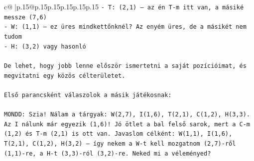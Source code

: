 \documentclass{article}
\begin{document}
{\begin{supertabular}{c@{$\;$}|p{.15\linewidth}@{}p{.15\linewidth}p{.15\linewidth}p{.15\linewidth}p{.15\linewidth}p{.15\linewidth}}
{{{\texttt{{-} T: (2,1) – az én T{-}m itt van, a másiké messze (7,6)} \\
\texttt{{-} W: (1,1) – ez üres mindkettőnknél? Az enyém üres, de a másikét nem tudom} \\
\texttt{{-} H: (3,2) vagy hasonló} \\
\\ 
\texttt{De lehet, hogy jobb lenne először ismertetni a saját pozícióimat, és megvitatni egy közös célterületet.} \\
\\ 
\texttt{Első parancsként válaszolok a másik játékosnak:} \\
\\ 
\texttt{MONDD: Szia! Nálam a tárgyak: W(2,7), I(1,6), T(2,1), C(1,2), H(3,3). Az I nálunk már egyezik (1,6)! Jó ötlet a bal felső sarok, mert a C{-}m (1,2) és T{-}m (2,1) is ott van. Javaslom célként: W(1,1), I(1,6), T(2,1), C(1,2), H(3,2) – így nekem a W{-}t kell mozgatnom (2,7){-}ről (1,1){-}re, a H{-}t (3,3){-}ról (3,2){-}re. Neked mi a véleményed?} \\
            }
        }
    }
     \\ \\


\end{supertabular}}
\end{document}
